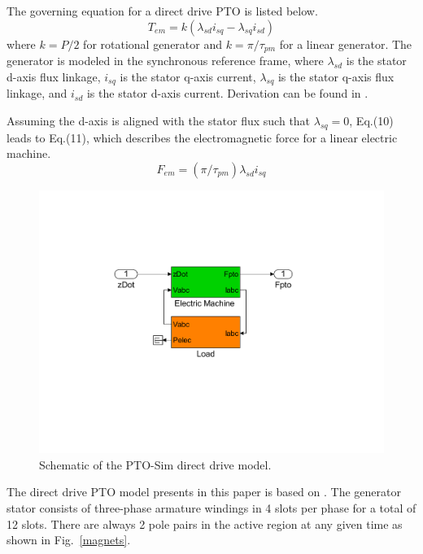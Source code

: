 \documentclass[twocolumn,10pt]{asme2e}
\begin{document}
The governing equation for a direct drive PTO is listed below. 
\begin{equation}
T_{em}=k(\lambda_{sd}i_{sq}- \lambda_{sq}i_{sd})
\end{equation}
\noindent where $k = P/2$ for rotational generator and $k = \pi/\tau_{pm}$ for a linear generator.  The generator is modeled in the synchronous reference frame, where $\lambda_{sd}$ is the stator d-axis flux linkage, $i_{sq}$ is the stator q-axis current, $\lambda_{sq}$ is the stator q-axis flux linkage, and $i_{sd}$ is the stator d-axis current.  Derivation can be found in \cite{mohan2001advanced}.

Assuming the d-axis is aligned with the stator flux such that $\lambda_{sq} = 0$, Eq.(10) leads to Eq.(11), which describes the electromagnetic force for a linear electric machine. 
\begin{equation}
F_{em}=(\pi/\tau_{pm})\lambda_{sd}i_{sq}
\end{equation}

\begin{figure}[t]
    \centering
    \includegraphics[width=1\columnwidth]{Images/DirectDriveSimulink}
    \caption{Schematic of the PTO-Sim direct drive model.}
    \label{DD}
    \end{figure}

The direct drive PTO model presents in this paper is based on \cite{prudell2009novel}. The generator stator consists of three-phase armature windings in 4 slots per phase for a total of 12 slots. There are always 2 pole pairs in the active region at any given time as shown in Fig.~\ref{magnets}.   
\end{document}
